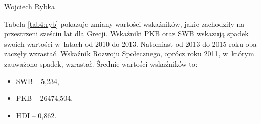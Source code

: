 \begin{artplenv}{Wojciech Rybka}
\begin{table}[H]
	\caption{Zmiana wartości wskaźników Grecji.
		Źródło: oobliczenia własne na podstawie
		\parencite{international_monetary_fund_world_2019a,united_nations_development_programme_human_2019,noauthor_world_2018}.
	}
	\label{tab4:ryb}
\end{table}

%

Tabela \ref{tab4:ryb} pokazuje zmiany wartości wskaźników, jakie zachodziły na przestrzeni sześciu lat dla Grecji. Wskaźniki PKB oraz
SWB wskazują spadek swoich wartości w~latach od 2010 do 2013. Natomiast od 2013 do 2015 roku oba zaczęły wzrastać.
Wskaźnik Rozwoju Społecznego, oprócz roku 2011, w~którym zauważono spadek, wzrastał. Średnie wartości wskaźników to:

\begin{itemize}
\item SWB -- 5,234,
\item PKB -- 26474,504,
\item HDI -- 0,862.
\end{itemize}


\end{artplenv}
